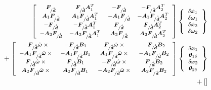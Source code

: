 \documentclass[10pt,fleqn,subeqn]{report}
\newcommand{\T}[1]{\bm{#1}}
\newcommand{\TT}[1]{\bm{#1}}
\begin{document}
\begin{align}
	\footnotesize
	\sqbr{\matr{cccc}{
		\T{F}_{/\dot{\tilde{\T{d}}}} 
		& \T{F}_{/\dot{\tilde{\T{d}}}} \TT{A}_1^T
		& - \T{F}_{/\dot{\tilde{\T{d}}}}
		& - \T{F}_{/\dot{\tilde{\T{d}}}} \TT{A}_2^T \\
%
		\TT{A}_1 \T{F}_{/\dot{\tilde{\T{d}}}} 
		& \TT{A}_1 \T{F}_{/\dot{\tilde{\T{d}}}} \TT{A}_1^T
		& - \TT{A}_1 \T{F}_{/\dot{\tilde{\T{d}}}}
		& - \TT{A}_1 \T{F}_{/\dot{\tilde{\T{d}}}} \TT{A}_2^T \\
%
		- \T{F}_{/\dot{\tilde{\T{d}}}} 
		& - \T{F}_{/\dot{\tilde{\T{d}}}} \TT{A}_1^T
		& \T{F}_{/\dot{\tilde{\T{d}}}}
		& \T{F}_{/\dot{\tilde{\T{d}}}} \TT{A}_2^T \\
%
		- \TT{A}_2 \T{F}_{/\dot{\tilde{\T{d}}}} 
		& - \TT{A}_2 \T{F}_{/\dot{\tilde{\T{d}}}} \TT{A}_1^T
		& \TT{A}_2 \T{F}_{/\dot{\tilde{\T{d}}}}
		& \TT{A}_2 \T{F}_{/\dot{\tilde{\T{d}}}} \TT{A}_2^T
	}} \cubr{\cvvect{
		\delta\dot{\T{x}}_1 \\
		\delta\T{\omega}_1 \\
		\delta\dot{\T{x}}_2 \\
		\delta\T{\omega}_2
	}} & \nonumber \\
	\footnotesize
	\mbox{} + \sqbr{\matr{cccc}{
		- \T{F}_{/\dot{\tilde{\T{d}}}} \hat{\T{\omega}}\times{}
		& - \T{F}_{/\dot{\tilde{\T{d}}}} \TT{B}_1
		& \T{F}_{/\dot{\tilde{\T{d}}}} \hat{\T{\omega}}\times{}
		& - \T{F}_{/\dot{\tilde{\T{d}}}} \TT{B}_2 \\
%
		- \TT{A}_1 \T{F}_{/\dot{\tilde{\T{d}}}} \hat{\T{\omega}}\times{}
		& - \TT{A}_1 \T{F}_{/\dot{\tilde{\T{d}}}} \TT{B}_1
		& \TT{A}_1 \T{F}_{/\dot{\tilde{\T{d}}}} \hat{\T{\omega}}\times{}
		& - \TT{A}_1 \T{F}_{/\dot{\tilde{\T{d}}}} \TT{B}_2 \\
%
		\T{F}_{/\dot{\tilde{\T{d}}}} \hat{\T{\omega}}\times{}
		& \T{F}_{/\dot{\tilde{\T{d}}}} \TT{B}_1
		& - \T{F}_{/\dot{\tilde{\T{d}}}} \hat{\T{\omega}}\times{}
		& \T{F}_{/\dot{\tilde{\T{d}}}} \TT{B}_2 \\
%
		\TT{A}_2 \T{F}_{/\dot{\tilde{\T{d}}}} \hat{\T{\omega}}\times{}
		& \TT{A}_2 \T{F}_{/\dot{\tilde{\T{d}}}} \TT{B}_1
		& - \TT{A}_2 \T{F}_{/\dot{\tilde{\T{d}}}} \hat{\T{\omega}}\times{}
		& \TT{A}_2 \T{F}_{/\dot{\tilde{\T{d}}}} \TT{B}_2
	}}\cubr{\cvvect{
		\delta\T{x}_1 \\
		\T{\theta}_{1\delta} \\
		\delta\T{x}_2 \\
		\T{\theta}_{2\delta}
	}} & \nonumber \\
	\footnotesize
	\mbox{} + \sqbr{\matr{cccc}{
}}
\end{align}
\end{document}
